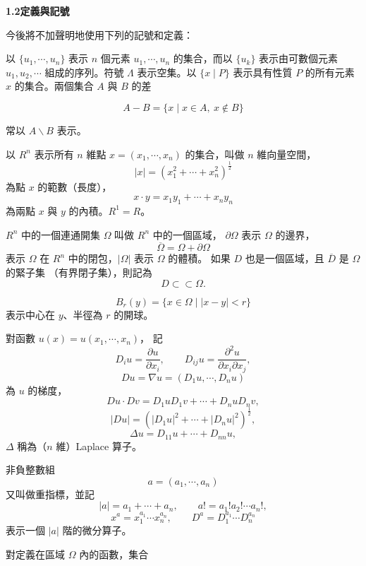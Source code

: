 \documentclass[11pt,a4paper,twoside]{article}
\newcommand{\pnum}[1]{%
    \makebox[0pt][r]{%
        \scriptsize\textbf{[#1]}\hspace{0.7em}%
    }%
}
\begin{document}
\setcounter{page}{3}



\textbf{1.2\qquad 定義與記號}

\vspace{0.8em}

\noindent
\pnum{1}
今後將不加聲明地使用下列的記號和定義：

\noindent
\pnum{2}
以
$\{u_1,\cdots,u_n\}$
表示 $n$ 個元素
$u_1,\cdots,u_n$
的集合，而以 $\{u_k\}$ 表示由可數個元素
$u_1,u_2,\cdots$
組成的序列。符號 $\Lambda$ 表示空集。以
$\{x\mid P\}$
表示具有性質 $P$ 的所有元素 $x$ 的集合。兩個集合 $A$ 與 $B$ 的差

\[
    A-B=\{x\mid x\in A,\ x\notin B\}
\]

常以 $A\backslash B$ 表示。

\noindent
\pnum{3}
以 $R^n$ 表示所有 $n$ 維點
$x=(x_1,\cdots,x_n)$
的集合，叫做 $n$ 維向量空間，
\[
    |x|
    =
    \left(x_1^2+\cdots+x_n^2\right)^{\frac12}
\]
為點 $x$ 的範數（長度），
\[
    x\cdot y
    =
    x_1y_1+\cdots+x_ny_n
\]
為兩點 $x$ 與 $y$ 的內積。$R^1=R$。

\noindent
\pnum{4}
$R^n$ 中的一個連通開集 $\Omega$ 叫做 $R^n$ 中的一個區域，
$\partial\Omega$ 表示 $\Omega$ 的邊界，
\[
    \overline{\Omega}=\Omega+\partial\Omega
\]
表示 $\Omega$ 在 $R^n$ 中的閉包，$|\Omega|$ 表示 $\Omega$ 的體積。
如果 $D$ 也是一個區域，且 $\overline{D}$ 是 $\Omega$ 的緊子集
（有界閉子集），則記為
\[
    D\subset \subset \Omega.
\]

\[
    B_r(y)
    =
    \{x\in\Omega\mid |x-y|<r\}
\]
表示中心在 $y$、半徑為 $r$ 的開球。

\noindent
\pnum{5}
對函數
$u(x)=u(x_1,\cdots,x_n)$，
記
\[
    D_i u=\frac{\partial u}{\partial x_i},
    \qquad
    D_{ij}u
    =
    \frac{\partial^2u}{\partial x_i\partial x_j},
\]
\[
    Du
    =
    \nabla u
    =
    (D_1u,\cdots,D_nu)
\]
為 $u$ 的梯度，
\[
    Du\cdot Dv
    =
    D_1uD_1v+\cdots+D_nuD_nv,
\]
\[
    |Du|
    =
    \left(
    |D_1u|^2+\cdots+|D_nu|^2
    \right)^{\frac12},
\]
\[
    \Delta u
    =
    D_{11}u+\cdots+D_{nn}u,
\]
$\Delta$ 稱為（$n$ 維）Laplace 算子。

\noindent
\pnum{6}
非負整數組
\[
    a =(a_1,\cdots,a_n)
\]
又叫做重指標，並記
\[
    |a|
    =
    a_1+\cdots+a_n,
    \qquad
    a!
    =
    a_1!a_2!\cdots a_n!,
\]
\[
    x^a
    =
    x_1^{a_1}\cdots x_n^{a_n},
    \qquad
    D^a
    =
    D_1^{a_1}\cdots D_n^{a_n}
\]
表示一個 $|a|$ 階的微分算子。

\noindent
\pnum{7}
對定義在區域 $\Omega$ 內的函數，集合
\end{document}
